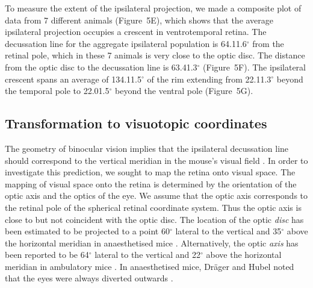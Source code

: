 \documentclass[10pt]{article}
\newcounter{Figure}
\begin{document}
To measure the extent of the ipsilateral projection, we made a
composite plot of data from 7 different animals (Figure~5E), which
shows that the average ipsilateral projection occupies a crescent in
ventrotemporal retina. The decussation line for the aggregate
ipsilateral population is 64.1{\textpm}1.6$^{\circ}$ from the retinal
pole, which in these 7 animals is very close to the optic disc. The
distance from the optic disc to the decussation line is
63.4{\textpm}1.3$^{\circ}$ (Figure~5F). The ipsilateral crescent spans an
average of 134.1{\textpm}1.5$^{\circ}$ of the rim extending from
22.1{\textpm}1.3$^{\circ}$ beyond the temporal pole  to
22.0{\textpm}1.5$^{\circ}$ beyond the ventral pole (Figure~5G).

\subsection*{Transformation to visuotopic coordinates}
The geometry of binocular vision implies that the ipsilateral
decussation line should correspond to the vertical meridian in the
mouse's visual field \cite{DragerOlsen1980,ColemanEtal2009}. In
order to investigate this prediction, we sought to map the retina
onto visual space. The mapping of visual space onto the retina is
determined by the orientation of the optic axis and the optics of the
eye. We assume that the optic axis corresponds to the retinal pole of
the spherical retinal coordinate system. Thus the optic axis is close
to but not coincident with the optic disc. The location of the optic
\textit{disc} has been estimated to be projected to a point 60$^{\circ}$
lateral to the vertical and 35$^{\circ}$ above the horizontal meridian in
anaesthetised mice \cite{Drager1978}. Alternatively, the optic
\textit{axis} has been reported to be 64$^{\circ}$ lateral to the
vertical and 22$^{\circ}$ above the horizontal meridian in ambulatory
mice \cite{OommenStahl2008}. In anaesthetised mice,  Dr\"ager and
Hubel noted that the eyes were always diverted outwards \cite{DragerHubel1976}.
\end{document}
